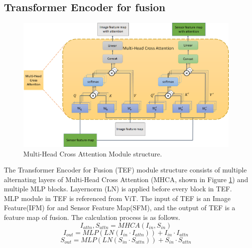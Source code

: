 \documentclass[acmsmall,manuscript, screen, review]{acmart}
\begin{document}
\subsection{Transformer Encoder for fusion}
\begin{figure}[htbp]
  \centering
  \includegraphics[width=\linewidth]{pic/cross_attention.png}
  \caption{Multi-Head Cross Attention Module structure.}
  \label{cross_attention}
\end{figure}
The Transformer Encoder for Fusion (TEF) module structure consists of multiple alternating layers of Multi-Head Cross Attention (MHCA, shown in Figure \ref{cross_attention}) and multiple MLP blocks. Layernorm (LN) is applied before every block in TEF. MLP module in TEF is referenced from ViT. The input of TEF is an Image Feature(IFM) for and Sensor Feature Map(SFM), and the output of TEF is a feature map of fusion. The calculation process is as follows.
\begin{equation}
  I_{attn},S_{attn}=MHCA\left(I_{in},S_{in}\right)
\end{equation}
\begin{equation}
  I_{out}=MLP\left(LN\left(I_{in}\cdot I_{attn}\right)\right)+I_{in}\cdot I_{attn}
\end{equation}
\begin{equation}
  S_{out}=MLP\left(LN\left(S_{in}\cdot S_{attn}\right)\right)+S_{in}\cdot S_{attn}
\end{equation}
\end{document}
